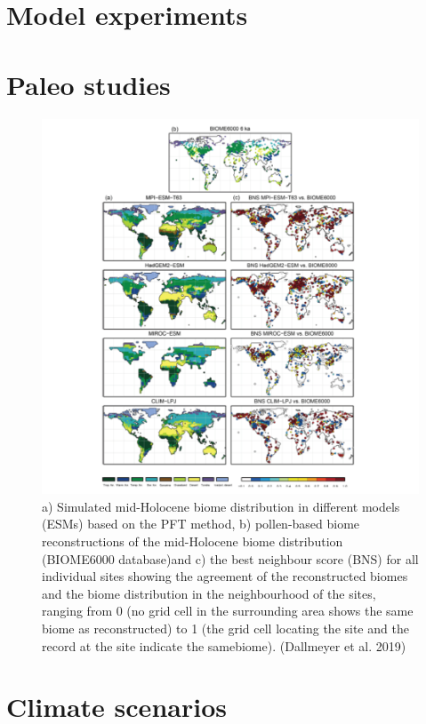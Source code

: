 \documentclass[12pt,oneside]{book}
\begin{document}
\section{Model experiments}\label{model-experiments}

\section{Paleo studies}\label{paleo-studies}

\begin{figure}

{\centering \includegraphics[width=0.8\linewidth]{figures/chap10/f10_5_paleo} 

}

\caption{a) Simulated mid-Holocene biome distribution in  different models (ESMs) based on the PFT method, b) pollen-based biome reconstructions of the mid-Holocene biome distribution (BIOME6000 database)and c) the best neighbour score (BNS) for all individual sites showing the agreement of the reconstructed biomes and the biome distribution in the neighbourhood of the sites, ranging from 0 (no grid cell in the surrounding area shows the same biome as reconstructed) to 1 (the grid cell locating the site and the record at the site indicate the samebiome). (Dallmeyer et al. 2019) }\label{fig:f105}
\end{figure}

\section{Climate scenarios}\label{climate-scenarios}
\end{document}
